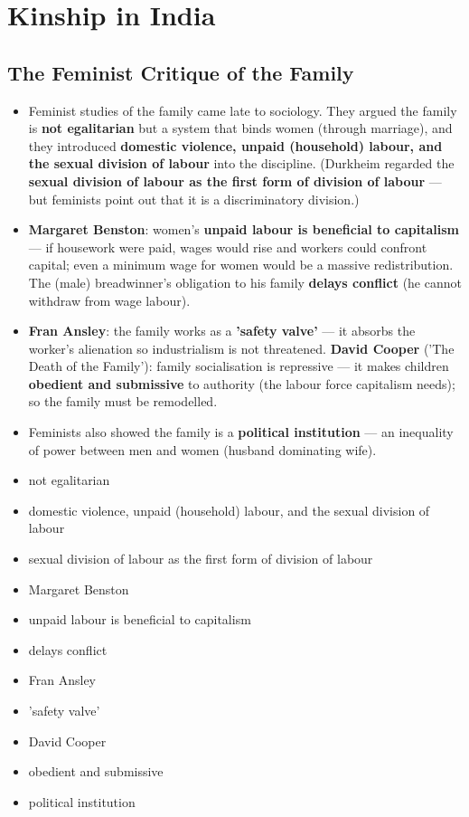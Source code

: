 \chapter{Kinship in India}

\section{The Feminist Critique of the Family}

\begin{KeyConcept}
\begin{itemize}
\item Feminist studies of the family came late to sociology. They argued the family is \textbf{not egalitarian} but a system that binds women (through marriage), and they introduced \textbf{domestic violence, unpaid (household) labour, and the sexual division of labour} into the discipline. (Durkheim regarded the \textbf{sexual division of labour as the first form of division of labour} --- but feminists point out that it is a discriminatory division.)
\item \textbf{Margaret Benston}: women's \textbf{unpaid labour is beneficial to capitalism} --- if housework were paid, wages would rise and workers could confront capital; even a minimum wage for women would be a massive redistribution. The (male) breadwinner's obligation to his family \textbf{delays conflict} (he cannot withdraw from wage labour).
\item \textbf{Fran Ansley}: the family works as a \textbf{'safety valve'} --- it absorbs the worker's alienation so industrialism is not threatened. \textbf{David Cooper} ('The Death of the Family'): family socialisation is repressive --- it makes children \textbf{obedient and submissive} to authority (the labour force capitalism needs); so the family must be remodelled.
\item Feminists also showed the family is a \textbf{political institution} --- an inequality of power between men and women (husband dominating wife).
\end{itemize}
\end{KeyConcept}

\begin{QuickRevision}
\begin{itemize}
\item not egalitarian
\item domestic violence, unpaid (household) labour, and the sexual division of labour
\item sexual division of labour as the first form of division of labour
\item Margaret Benston
\item unpaid labour is beneficial to capitalism
\item delays conflict
\item Fran Ansley
\item 'safety valve'
\item David Cooper
\item obedient and submissive
\item political institution
\end{itemize}
\end{QuickRevision}

